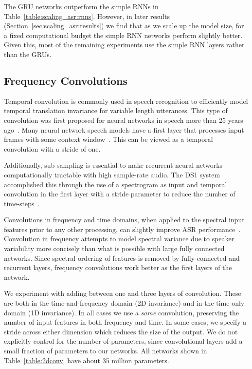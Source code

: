 The GRU networks outperform the simple RNNs in
Table~\ref{table:scaling_asr:rnns}. However, in later results
(Section~\ref{sec:scaling_asr:results}) we find that as we scale up the model
size, for a fixed computational budget the simple RNN networks perform slightly
better.  Given this, most of the remaining experiments use the simple RNN
layers rather than the GRUs.

\subsection{Frequency Convolutions}

Temporal convolution is commonly used in speech recognition to efficiently
model temporal translation invariance for variable length utterances. This type
of convolution was first proposed for neural networks in speech more than 25
years ago~\cite{waibel1989}. Many neural network speech models have a first
layer that processes input frames with some context window~\cite{dahl2011,
vesely2013}. This can be viewed as a temporal convolution with a stride of one. 

Additionally, sub-sampling is essential to make recurrent neural networks
computationally tractable with high sample-rate audio. The DS1 system
accomplished this through the use of a spectrogram as input and temporal
convolution in the first layer with a stride parameter to reduce the number of
time-steps~\cite{hannun2014deepspeech}.

Convolutions in frequency and time domains, when applied to the spectral input
features prior to any other processing, can slightly improve ASR
performance~\cite{abdelhamid2012, sainath2013cnn, soltau2014}. Convolution in
frequency attempts to model spectral variance due to speaker variability more
concisely than what is possible with large fully connected networks. Since
spectral ordering of features is removed by fully-connected and recurrent
layers, frequency convolutions work better as the first layers of the network.

We experiment with adding between one and three layers of convolution. These
are both in the time-and-frequency domain (2D invariance) and in the time-only
domain (1D invariance). In all cases we use a \emph{same} convolution,
preserving the number of input features in both frequency and time. In some
cases, we specify a stride across either dimension which reduces the size of
the output. We do not explicitly control for the number of parameters, since
convolutional layers add a small fraction of parameters to our networks. All
networks shown in Table~\ref{table:2dconv} have about 35 million parameters.

